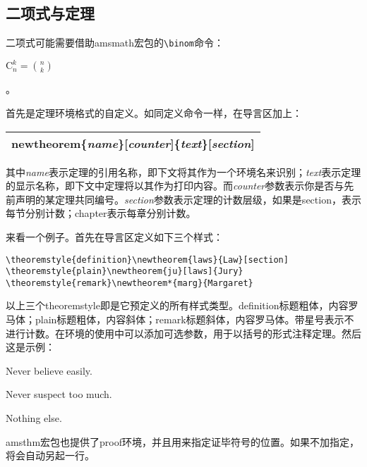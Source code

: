 {\subsection{二项式与定理}
二项式可能需要借助amsmath宏包的\verb|\binom|命令：

\begin{codeshow}
  $\mathrm{C}_n^k=\binom{n}{k}$
\end{codeshow}

。

首先是定理环境格式的自定义。如同定义命令一样，在导言区加上：

\noindent\begin{tabular}{|l|}
\hline
\char92{}newtheorem\{\textit{name}\}[\textit{counter}]\{\textit{text}\}[\textit{section}] \\
\hline
\end{tabular}

其中\textit{name}表示定理的引用名称，即下文将其作为一个环境名来识别；\textit{text}表示定理的显示名称，即下文中定理将以其作为打印内容。而\textit{counter}参数表示你是否与先前声明的某定理共同编号。\textit{section}参数表示定理的计数层级，如果是section，表示每节分别计数；chapter表示每章分别计数。

来看一个例子。首先在导言区定义如下三个样式：
\begin{verbatim}
\theoremstyle{definition}\newtheorem{laws}{Law}[section]
\theoremstyle{plain}\newtheorem{ju}[laws]{Jury}
\theoremstyle{remark}\newtheorem*{marg}{Margaret}
\end{verbatim}

以上三个theoremstyle即是它预定义的所有样式类型。definition标题粗体，内容罗马体；plain标题粗体，内容斜体；remark标题斜体，内容罗马体。带星号表示不进行计数。在环境的使用中可以添加可选参数，用于以括号的形式注释定理。然后这是示例：

\begin{codeshow}
\begin{laws}
Never believe easily.
\end{laws}
\begin{ju}[The 2nd]
Never suspect too much.
\end{ju}
\begin{marg}Nothing else.\end{marg}
\end{codeshow}

amsthm宏包也提供了proof环境，并且用\latexline{\\qedhere}来指定证毕符号的位置。如果不加指定，将会自动另起一行。

}
